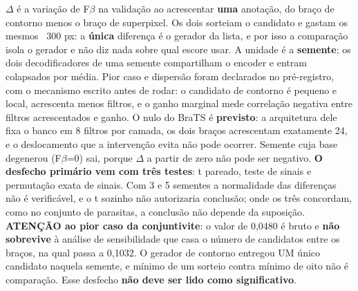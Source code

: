 \footnotesize $\Delta$ é a variação de F$\beta$ na validação ao acrescentar \textbf{uma} anotação, do braço de contorno menos o braço de superpixel. Os dois sorteiam o candidato e gastam os mesmos ~300 px: a \textbf{única} diferença é o gerador da lista, e por isso a comparação isola o gerador e não diz nada sobre qual escore usar. A unidade é a \textbf{semente}; os dois decodificadores de uma semente compartilham o encoder e entram colapsados por média. Pior caso e dispersão foram declarados no pré-registro, com o mecanismo escrito antes de rodar: o candidato de contorno é pequeno e local, acrescenta menos filtros, e o ganho marginal mede correlação negativa entre filtros acrescentados e ganho. O nulo do BraTS é \textbf{previsto}: a arquitetura dele fixa o banco em 8 filtros por camada, os dois braços acrescentam exatamente 24, e o deslocamento que a intervenção evita não pode ocorrer. Semente cuja base degenerou (F$\beta$=0) sai, porque $\Delta$ a partir de zero não pode ser negativo. \textbf{O desfecho primário vem com três testes}: t pareado, teste de sinais e permutação exata de sinais. Com 3 e 5 sementes a normalidade das diferenças não é verificável, e o t sozinho não autorizaria conclusão; onde os três concordam, como no conjunto de parasitas, a conclusão não depende da suposição. \textbf{ATENÇÃO ao pior caso da conjuntivite}: o valor de 0,0480 é bruto e \textbf{não sobrevive} à análise de sensibilidade que casa o número de candidatos entre os braços, na qual passa a 0,1032. O gerador de contorno entregou UM único candidato naquela semente, e mínimo de um sorteio contra mínimo de oito não é comparação. Esse desfecho \textbf{não deve ser lido como significativo}.
\normalsize
